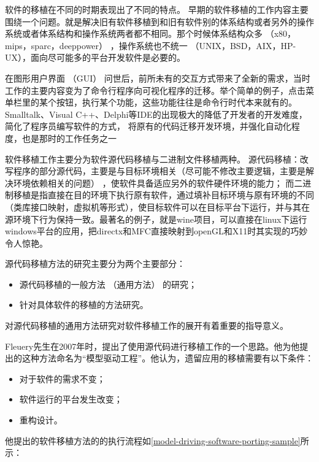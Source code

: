 软件的移植在不同的时期表现出了不同的特点。
早期的软件移植的工作内容主要围绕一个问题。就是解决旧有软件移植到和旧有软件别的体系结构或者另外的操作系统或者体系结构和操作系统两者都不相同。那个时候体系结构众多 （x80，mips，sparc，deeppower） ，操作系统也不统一 （UNIX，BSD，AIX，HP-UX），面向尽可能多的平台开发软件是必要的。

在图形用户界面 （GUI） 问世后，前所未有的交互方式带来了全新的需求，当时工作的主要内容变为了命令行程序向可视化程序的迁移。举个简单的例子，点击菜单栏里的某个按钮，执行某个功能，这些功能往往是命令行时代本来就有的。Smalltalk、Visual C++、Delphi等IDE的出现极大的降低了开发者的开发难度，简化了程序员编写软件的方式，
将原有的代码迁移开发环境，并强化自动化程度，也是那时的工作任务之一

软件移植工作主要分为软件源代码移植与二进制文件移植两种。
源代码移植：改写程序的部分源代码，主要是与目标环境相关（尽可能不修改主要逻辑，主要是解决环境依赖相关的问题） ，使软件具备适应另外的软件硬件环境的能力；
而二进制移植是指直接在目的环境下执行原有软件，通过填补目标环境与原有环境的不同 （类库接口映射，虚拟机等形式），使目标软件可以在目标平台下运行，并与其在源环境下行为保持一致。最著名的例子，就是wine项目，可以直接在linux下运行windows平台的应用，把directx和MFC直接映射到openGL和X11时其实现的巧妙令人惊艳。

源代码移植方法的研究主要分为两个主要部分：

\begin{itemize}[itemindent=2em]
    \item 源代码移植的一般方法 （通用方法） 的研究；
    \item 针对具体软件的移植的方法研究。
\end{itemize}

对源代码移植的通用方法研究对软件移植工作的展开有着重要的指导意义。

Fleuery先生在2007年时，提出了使用源代码进行移植工作的一个思路。他为他提出的这种方法命名为“模型驱动工程”。他认为，遗留应用的移植需要有以下条件：

\begin{itemize}
    \item 对于软件的需求不变；
    \item 软件运行的平台发生改变；
    \item 重构设计。
\end{itemize}

他提出的软件移植方法的的执行流程如\ref{model-driving-software-porting-sample}所示：

